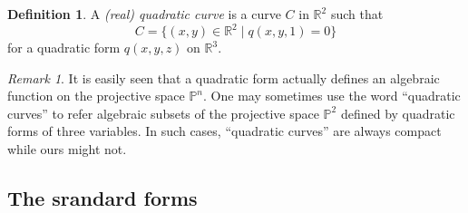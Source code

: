 \documentclass[pdftex,a4paper,12pt]{scrartcl}
\theoremstyle{plain}
\theoremstyle{definition}
\newtheorem{definition}{Definition}
\theoremstyle{remark}
\newtheorem{remark}[theorem]{Remark}
\numberwithin{equation}{section}
\begin{document}
\begin{definition}
A \emph{(real) quadratic curve} is a curve $C$ in $\mathbb R^2$ such that
\[
C=\{(x,y)\in\mathbb R^2\mid q(x,y,1)=0\}
\]
for a quadratic form $q(x,y,z)$ on $\mathbb R^3$.
\end{definition}

\begin{remark}
It is easily seen that a quadratic form actually defines an algebraic function on the projective space $\mathbb P^n$.
One may sometimes use the word ``quadratic curves'' to refer algebraic subsets of the projective space $\mathbb P^2$ defined by quadratic forms of three variables.
In such cases, ``quadratic curves'' are always compact while ours might not.
\end{remark}

\subsection{The srandard forms}
\end{document}
